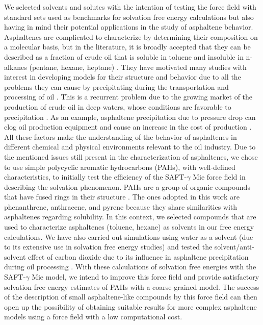 \documentclass[preprint]{elsarticle}
\begin{document}
	We selected solvents and solutes with the intention of testing the force field with standard sets used as benchmarks for solvation free energy calculations but also having in mind their potential applications in the study of asphaltene behavior. Asphaltenes are complicated to characterize by determining their composition on a molecular basis, but in the literature, it is broadly accepted that they can be described as a fraction of crude oil that is soluble in toluene and insoluble in n-alkanes (pentane, hexane, heptane) \cite{SJOBLOM2003399}. They have motivated many studies with interest in developing models for their structure and behavior due to all the problems they can cause by precipitating during the transportation and processing of oil \cite{SJOBLOM20151}. This is a recurrent problem due to the growing market of the production of crude oil in deep waters, whose conditions are favorable to precipitation \cite{AIC:AIC10243}. As an example, asphaltene precipitation due to pressure drop can clog oil production equipment and cause an increase in the cost of production \cite{doi:10.1021/ef010047l}. All these factors make the understanding of the behavior of asphaltenes in different chemical and physical environments relevant to the oil industry. Due to the mentioned issues still present in the characterization of asphaltenes, we chose to use simple polycyclic aromatic hydrocarbons (PAHs), with well-defined characteristics, to initially test the efficiency of the SAFT-$\gamma$ Mie force field in describing the solvation phenomenon. PAHs are a group of organic compounds that have fused rings in their structure \cite{RAVINDRA20082895}. The ones adopted in this work are phenanthrene, anthracene, and pyrene because they share similarities with asphaltenes regarding solubility. In this context, we selected compounds that are used to characterize asphaltenes (toluene, hexane) as solvents in our free energy calculations. We have also carried out simulations using water as a solvent (due to its extensive use in solvation free energy studies) and tested the solvent/anti-solvent effect of carbon dioxide due to its influence in asphaltene precipitation during oil processing \cite{SOROUSH2014405}. With these calculations of solvation free energies with the SAFT-$\gamma$ Mie model, we intend to improve this force field and provide satisfactory solvation free energy estimates of PAHs with a coarse-grained model. The success of the description of small asphaltene-like compounds by this force field can then open up the possibility of obtaining suitable results for more complex asphaltene models using a force field with a low computational cost.
	
\end{document}
